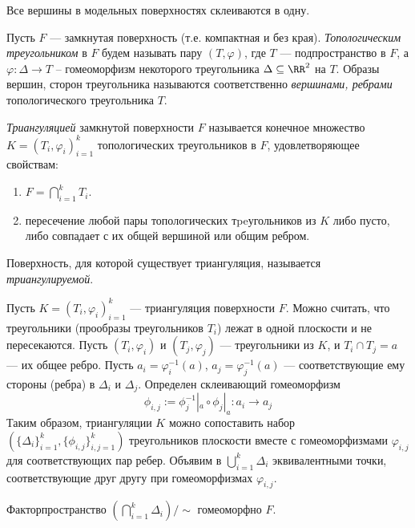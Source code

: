 \documentclass[12pt,a4paper]{article}
\begin{document}
    \begin{remark*}
        Все вершины в модельных поверхностях склеиваются в одну.
    \end{remark*}

    \begin{definition}
        Пусть $F$ --- замкнутая поверхность (т.е. компактная и без края). \emph{Топологическим треугольником} в $F$ будем называть пару $(T, \varphi)$, где $T$ --- подпространство в $F$, а $\varphi: \Delta \to T$ – гомеоморфизм некоторого треугольника $\Delta \subseteq \RR^2$ на $T$. Образы вершин, сторон треугольника называются соответственно \emph{вершинами, ребрами} топологического треугольника $T$.
    \end{definition}

    \begin{definition}
        \emph{Триангуляцией} замкнутой поверхности $F$ называется конечное множество $K = {(T_i, \varphi_i)}_{i=1}^k$ топологических треугольников в $F$, удовлетворяющее свойствам:
        \begin{enumerate}
            \item $F = \bigcap_{i=1}^k T_i$.
            \item пересечение любой пары топологических тpeугольников из $K$ либо пусто, либо совпадает с их общей вершиной или общим ребром.
        \end{enumerate}
        Поверхность, для которой существует триангуляция, называется \emph{триангулируемой}.
    \end{definition}

    \begin{remark}
        Пусть $K = {(T_i, \varphi_i)}_{i=1}^k$ --- триангуляция поверхности $F$. Можно считать, что треугольники (прообразы треугольников $T_i$) лежат в одной плоскости и не пересекаются. Пусть $(T_i, \varphi_i)$ и $(T_j,\varphi_j)$ --- треугольники из $K$, и $T_i\cap T_j = a$ --- их общее ребро. Пусть $a_i = \varphi_i^{-1}(a)$, $a_j = \varphi_j^{-1}(a)$ --- соответствующие ему стороны (ребра) в $\Delta_i$ и $\Delta_j$. Определен склеивающий гомеоморфизм
        \[\phi_{i, j} := \phi_j^{-1} |_a \circ \phi_j |_a: a_i \to a_j\]
        Таким образом, триангуляции $K$ можно сопоставить набор $(\{\Delta_i\}_{i=1}^k, \{\phi_{i, j}\}_{i, j = 1}^k)$ треугольников плоскости вместе с гомеоморфизмами $\varphi_{i, j}$ для соответствующих пар ребер. Объявим в $\bigcup_{i=1}^k \Delta_i$ эквивалентными точки, соответствующие друг другу при гомеоморфизмах $\varphi_{i, j}$.

        \begin{theorem}
            Факторпространство $(\bigcap_{i=1}^k \Delta_i)/\sim$ гомеоморфно $F$.
        \end{theorem}
    \end{remark}
\end{document}
